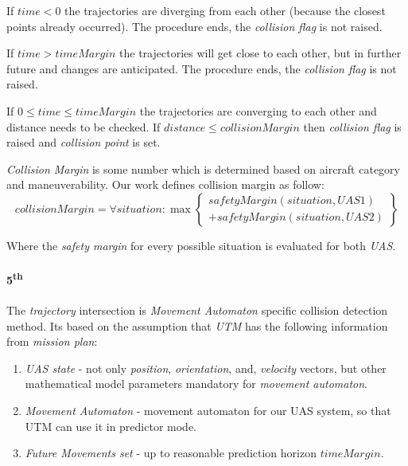 \noindent If $time < 0$ the trajectories are diverging from each other (because the closest points already occurred). The procedure ends, the \emph{collision flag} is not raised.

If $time > time Margin$ the trajectories will get close to each other, but in further future and changes are anticipated. The procedure ends, the \emph{collision flag} is not raised.

If $0 \le time \le timeMargin$ the trajectories are converging to each other and distance needs to be checked. If $distance \le collisionMargin$ then \emph{collision flag} is raised and \emph{collision point} is set.

\begin{note}
    \emph{Collision Margin} is some number which is determined based on aircraft category and maneuverability. Our work defines collision margin as follow:
    \begin{equation}
        collisionMargin = \forall situation : \max\left\{\begin{gathered}safetyMargin(situation,UAS1)\\ +safetyMargin(situation,UAS2) \end{gathered}\right\}
    \end{equation}
    
    Where the \emph{safety margin} for every possible situation is evaluated for both \emph{UAS}.
\end{note}

\paragraph{5\textsuperscript{th}} The \emph{trajectory} intersection is \emph{Movement Automaton} specific collision detection method. Its based on the assumption that \emph{UTM} has the following information from \emph{mission plan}:
\begin{enumerate}
    \item \emph{UAS state} - not only \emph{position}, \emph{orientation}, and, \emph{velocity} vectors, but other mathematical model parameters mandatory for \emph{movement automaton}.
    
    \item \emph{Movement Automaton} - movement automaton for our UAS system, so that UTM can use it in predictor mode.
    
    \item \emph{Future Movements set} - up to reasonable prediction horizon $timeMargin$. 
\end{enumerate}

